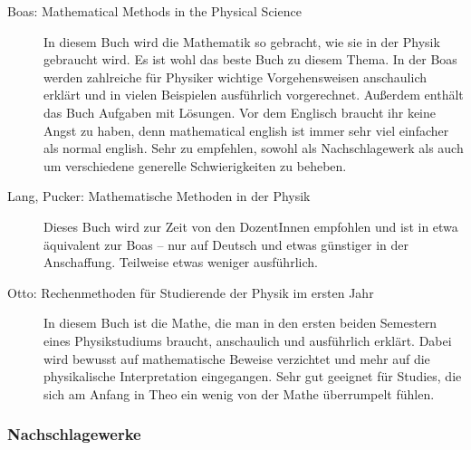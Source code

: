 \begin{description}

\item[Boas: Mathematical Methods in the Physical Science]{
In diesem Buch wird die Mathematik so gebracht, wie sie in der Physik
gebraucht
wird. Es ist wohl das beste Buch zu diesem Thema. In der Boas werden
zahlreiche
für Physiker wichtige Vorgehensweisen anschaulich erklärt und in
vielen
Beispielen ausführlich vorgerechnet. Außerdem enthält das
Buch Aufgaben mit Lösungen. Vor dem Englisch braucht ihr keine Angst zu
haben, denn mathematical english ist immer sehr viel einfacher als
normal
english. Sehr zu empfehlen, sowohl als Nachschlagewerk als auch um
verschiedene
generelle Schwierigkeiten zu beheben.}

\item[Lang, Pucker: Mathematische Methoden in der Physik]{
Dieses Buch wird zur Zeit von den DozentInnen empfohlen und ist in etwa
äquivalent zur Boas -- nur auf Deutsch und etwas günstiger in der
Anschaffung.
Teilweise etwas weniger ausführlich.}



\item[Otto: Rechenmethoden für Studierende der Physik im ersten Jahr]{
In diesem Buch ist die Mathe, die man in den ersten beiden Semestern eines Physikstudiums braucht, anschaulich und ausführlich erklärt. Dabei wird bewusst auf mathematische Beweise verzichtet und mehr auf die physikalische Interpretation eingegangen. Sehr gut geeignet für Studies, die sich am Anfang in Theo ein wenig von der Mathe überrumpelt fühlen.}
\end{description}

\subsubsection*{Nachschlagewerke}

